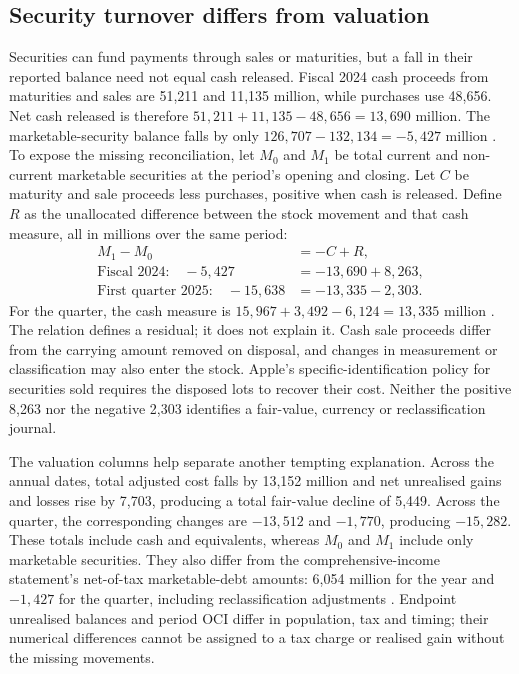 \subsection{Security turnover differs from valuation}

Securities can fund payments through sales or maturities, but a fall in their
reported balance need not equal cash released. Fiscal 2024 cash proceeds from
maturities and sales are 51,211 and 11,135 million, while purchases use 48,656.
Net cash released is therefore $51{,}211+11{,}135-48{,}656=13{,}690$ million.
The marketable-security balance falls by only
$126{,}707-132{,}134=-5{,}427$ million
\citep[cash-flow statement, printed p.~33, and Note 4]{apple2024}.
To expose the missing reconciliation, let $M_0$ and $M_1$ be total current
and non-current marketable securities at the period's opening and closing.
Let $C$ be maturity and sale proceeds less purchases, positive when cash is
released. Define $R$ as the unallocated difference between the stock movement
and that cash measure, all in millions over the same period:
\[
\begin{aligned}
 M_1-M_0&=-C+R,\\
 \text{Fiscal 2024:}\quad -5{,}427&=-13{,}690+8{,}263,\\
 \text{First quarter 2025:}\quad -15{,}638&=-13{,}335-2{,}303.
\end{aligned}
\]
For the quarter, the cash measure is
$15{,}967+3{,}492-6{,}124=13{,}335$ million
\citep[cash-flow statement and Note 4]{apple2025q1}. The relation defines a
residual; it does not explain it. Cash sale proceeds differ from the carrying
amount removed on disposal, and changes in measurement or classification may
also enter the stock. Apple's specific-identification policy for securities
sold requires the disposed lots to recover their cost. Neither the positive
8,263 nor the negative 2,303 identifies a fair-value, currency or
reclassification journal.

The valuation columns help separate another tempting explanation. Across the
annual dates, total adjusted cost falls by 13,152 million and net unrealised
gains and losses rise by 7,703, producing a total fair-value decline of 5,449.
Across the quarter, the corresponding changes are $-13{,}512$ and
$-1{,}770$, producing $-15{,}282$. These totals include cash and equivalents,
whereas $M_0$ and $M_1$ include only marketable securities. They also differ from the
comprehensive-income statement's net-of-tax marketable-debt amounts: 6,054
million for the year and $-1{,}427$ for the quarter, including reclassification
adjustments \citep[comprehensive-income statement, printed p.~31]{apple2024}
\citep[comprehensive-income statement, printed p.~2]{apple2025q1}. Endpoint
unrealised balances and period OCI differ in population, tax and timing;
their numerical differences cannot be assigned to a tax charge or realised
gain without the missing movements.


